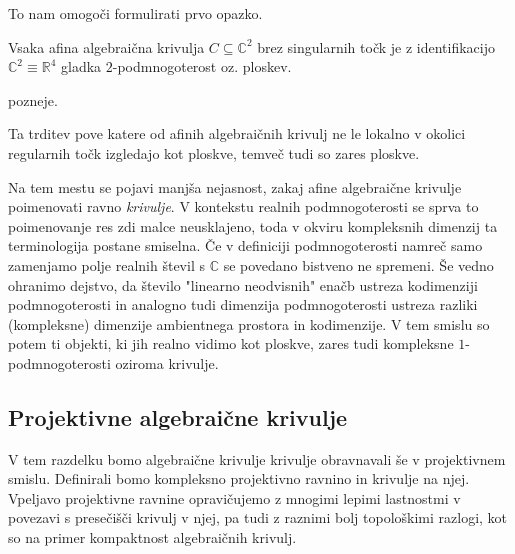 \documentclass[mat1]{fmfdelo}
\newcommand{\R}{\mathbb R}
\newcommand{\C}{\mathbb C}
\begin{document}
To nam omogoči formulirati prvo opazko.

\begin{trditev}
Vsaka afina algebraična krivulja $C \subseteq \C^2$ brez singularnih točk je z identifikacijo $\C^2 \equiv \R^4$ gladka $2$-podmnogoterost oz. ploskev.
\end{trditev}

\begin{dokaz}
    pozneje.
\end{dokaz}

Ta trditev pove katere od afinih algebraičnih krivulj ne le lokalno v okolici regularnih točk izgledajo kot ploskve, temveč tudi so zares ploskve. 
\par
Na tem mestu se pojavi manjša nejasnost, zakaj afine algebraične krivulje poimenovati ravno \emph{krivulje}. V kontekstu realnih podmnogoterosti se sprva to poimenovanje res zdi malce neusklajeno, toda v okviru kompleksnih dimenzij ta terminologija postane smiselna. Če v definiciji podmnogoterosti namreč samo zamenjamo polje realnih števil s $\C$ se povedano bistveno ne spremeni. Še vedno ohranimo dejstvo, da število "linearno neodvisnih" enačb ustreza kodimenziji podmnogoterosti in analogno tudi dimenzija podmnogoterosti ustreza razliki (kompleksne) dimenzije ambientnega prostora in kodimenzije. V tem smislu so potem ti objekti, ki jih realno vidimo kot ploskve, zares tudi kompleksne $1$-podmnogoterosti oziroma krivulje.

 

\subsection{Projektivne algebraične krivulje}

V tem razdelku bomo algebraične krivulje krivulje obravnavali še v projektivnem smislu. Definirali bomo kompleksno projektivno ravnino in krivulje na njej. Vpeljavo projektivne ravnine opravičujemo z mnogimi lepimi lastnostmi v povezavi s presečišči krivulj v njej, pa tudi z raznimi bolj topološkimi razlogi, kot so na primer kompaktnost algebraičnih krivulj.
\end{document}
